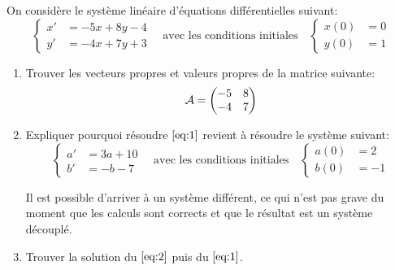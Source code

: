 \begin{td-exo}[] %
	On considère le système linéaire d'équations différentielles suivant:
	\begin{equation}\label{eq:1}
		\begin{cases}
			x'&=-5x+8y-4\\
			y'&=-4x+7y+3
		\end{cases}
		\quad\text{avec les conditions initiales}\quad
		\begin{cases}
			x(0)&=0\\
			y(0)&=1
		\end{cases}
	\end{equation}

	\begin{enumerate}
		\item Trouver les vecteurs propres et valeurs propres de la matrice suivante:
		\begin{equation*}
			\cal A=
			\begin{pmatrix}
				-5&8\\
				-4&7
			\end{pmatrix}
		\end{equation*}

		\item Expliquer pourquoi résoudre \(\eqref{eq:1}\) revient à résoudre le système
		suivant:
		\begin{equation}\label{eq:2}
			\begin{cases}
				a'&=3a+10\\
				b'&=-b-7
			\end{cases}
			\quad\text{avec les conditions initiales}\quad
			\begin{cases}
				a(0)&=2\\
				b(0)&=-1
			\end{cases}
		\end{equation}

		\begin{remark}[]
			Il est possible d'arriver à un système différent, ce qui n'est pas grave du
			moment que les calculs sont corrects et que le résultat est un système découplé.
		\end{remark}

		\item Trouver la solution du \(\eqref{eq:2}\) puis du \(\eqref{eq:1}\).
	\end{enumerate}
\end{td-exo}
